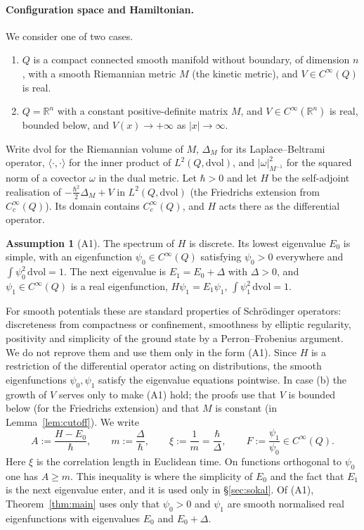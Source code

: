 \documentclass[11pt,a4paper]{article}
\theoremstyle{definition}
\newtheorem{assumption}[theorem]{Assumption}
\theoremstyle{remark}
\newcommand{\R}{\mathbb{R}}
\newcommand{\dvol}{\,\mathrm{dvol}}
\begin{document}
\paragraph{Configuration space and Hamiltonian.}
We consider one of two cases.
\begin{enumerate}[label=(\alph*)]
\item $Q$ is a compact connected smooth manifold without boundary, of dimension $n$, with a smooth Riemannian metric $M$ (the kinetic metric), and $V\in C^\infty(Q)$ is real.
\item $Q=\R^n$ with a constant positive-definite matrix $M$, and $V\in C^\infty(\R^n)$ is real, bounded below, and $V(x)\to+\infty$ as $|x|\to\infty$.
\end{enumerate}

Write $\mathrm{dvol}$ for the Riemannian volume of $M$, $\Delta_M$ for its Laplace--Beltrami operator, $\langle\cdot,\cdot\rangle$ for the inner product of $L^2(Q,\mathrm{dvol})$, and $|\omega|_{M^{-1}}^2$ for the squared norm of a covector $\omega$ in the dual metric.
Let $\hbar>0$ and let $H$ be the self-adjoint realisation of $-\tfrac{\hbar^2}{2}\Delta_M+V$ in $L^2(Q,\mathrm{dvol})$ (the Friedrichs extension from $C_c^\infty(Q)$).
Its domain contains $C_c^\infty(Q)$, and $H$ acts there as the differential operator.

\begin{assumption}[A1]\label{ass:A1}
The spectrum of $H$ is discrete.
Its lowest eigenvalue $E_0$ is simple, with an eigenfunction $\psi_0\in C^\infty(Q)$ satisfying $\psi_0>0$ everywhere and $\int\psi_0^2\dvol=1$.
The next eigenvalue is $E_1=E_0+\Delta$ with $\Delta>0$, and $\psi_1\in C^\infty(Q)$ is a real eigenfunction, $H\psi_1=E_1\psi_1$, $\int\psi_1^2\dvol=1$.
\end{assumption}

For smooth potentials these are standard properties of Schr\"odinger operators: discreteness from compactness or confinement, smoothness by elliptic regularity, positivity and simplicity of the ground state by a Perron--Frobenius argument.
We do not reprove them and use them only in the form (A1).
Since $H$ is a restriction of the differential operator acting on distributions, the smooth eigenfunctions $\psi_0,\psi_1$ satisfy the eigenvalue equations pointwise.
In case (b) the growth of $V$ serves only to make (A1) hold; the proofs use that $V$ is bounded below (for the Friedrichs extension) and that $M$ is constant (in Lemma~\ref{lem:cutoff}).
We write
\[
  A:=\frac{H-E_0}{\hbar},\qquad m:=\frac{\Delta}{\hbar},\qquad \xi:=\frac1m=\frac{\hbar}{\Delta},\qquad F:=\frac{\psi_1}{\psi_0}\in C^\infty(Q).
\]
Here $\xi$ is the correlation length in Euclidean time.
On functions orthogonal to $\psi_0$ one has $A\ge m$.
This inequality is where the simplicity of $E_0$ and the fact that $E_1$ is the next eigenvalue enter, and it is used only in \S\ref{sec:sokal}.
Of (A1), Theorem~\ref{thm:main} uses only that $\psi_0>0$ and $\psi_1$ are smooth normalised real eigenfunctions with eigenvalues $E_0$ and $E_0+\Delta$.
\end{document}
